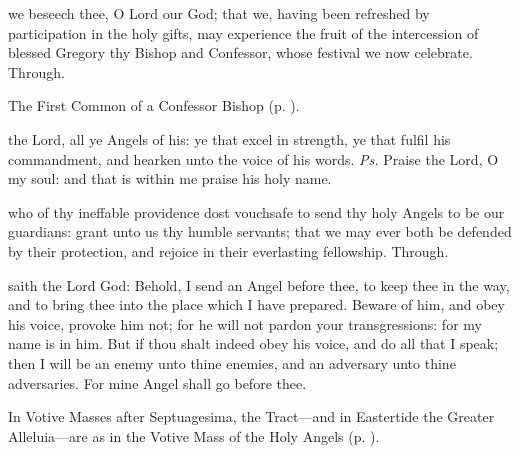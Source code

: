 \postcommunion\label{ArmeniaPostcommunion}
 we beseech thee, O Lord our God; that we, having been refreshed by participation in the holy gifts, may experience the fruit of the intercession of blessed Gregory thy Bishop and Confessor, whose festival we now celebrate. Through.



\begin{rubric}
	The First Common of a Confessor Bishop (p. \pageref{CommonConfessorBishopI}).
\end{rubric}



\introit
{} the Lord, all ye Angels of his: ye that excel in strength, ye that fulfil his commandment, and hearken unto the voice of his words. \textit{Ps.} Praise the Lord, O my soul: and that is within me praise his holy name.

\collect
{} who of thy ineffable providence dost vouchsafe to send thy holy Angels to be our guardians: grant unto us thy humble servants; that we may ever both be defended by their protection, and rejoice in their everlasting fellowship. Through.

 saith the Lord God: Behold, I send an Angel before thee, to keep thee in the way, and to bring thee into the place which I have prepared. Beware of him, and obey his voice, provoke him not; for he will not pardon your transgressions: for my name is in him. But if thou shalt indeed obey his voice, and do all that I speak; then I will be an enemy unto thine enemies, and an adversary unto thine adversaries. For mine Angel shall go before thee.



\begin{rubric}
	In Votive Masses after Septuagesima, the Tract---and in Eastertide the Greater Alleluia---are as in the Votive Mass of the Holy Angels (p. \pageref{MassOfTheAngels}).
\end{rubric}

